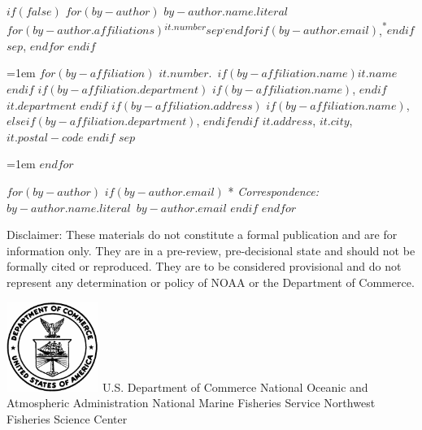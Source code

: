 \begin{minipage}[b][\textheight][s]{\textwidth}
$if(false)$
  $for(by-author)$
    {$by-author.name.literal$}$for(by-author.affiliations)${\textsuperscript{$it.number$}}$sep${\textsuperscript{,}}$endfor$$if(by-author.email)$,{\textsuperscript{*}}$endif$$sep$,
$endfor$
$endif$


\vspace{2\baselineskip}

\hangindent=1em
$for(by-affiliation)$%
{$it.number$}.~$if(by-affiliation.name)${$it.name$}$endif$%
$if(by-affiliation.department)$%
$if(by-affiliation.name)$, $endif$%
{$it.department$}%
$endif$%
$if(by-affiliation.address)$%
$if(by-affiliation.name)$, $else$$if(by-affiliation.department)$, $endif$$endif$%
{$it.address$, $it.city$, $it.postal-code$}%
$endif$%
$sep$\par\hangindent=1em%
$endfor$


\vspace{1\baselineskip}

$for(by-author)$
$if(by-author.email)$
* \textit{Correspondence:}~$by-author.name.literal$~$by-author.email$
$endif$
$endfor$


\vfill


Disclaimer: These materials do not constitute a formal publication and are for information only. They are in a pre-review, pre-decisional state and should not be formally cited or reproduced. They are to be considered provisional and do not represent any determination or policy of NOAA or the Department of Commerce.

\vspace{1\baselineskip}

\includegraphics[alt={},width=3cm]{support_files/us_doc_logo.png}\newline %
U.S. Department of Commerce\newline
National Oceanic and Atmospheric Administration\newline
National Marine Fisheries Service\newline
Northwest Fisheries Science Center\newline



\end{minipage}

